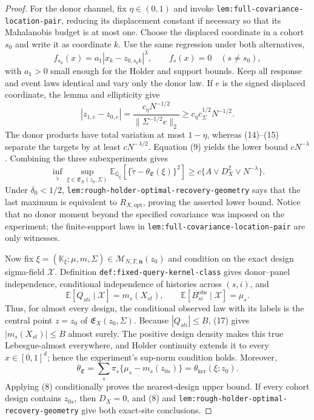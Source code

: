 \documentclass{article}
\begin{document}
\begin{proof}
For the donor channel, fix \(\eta\in(0,1)\) and invoke \texttt{lem:full-covariance-location-pair}, reducing its displacement constant if necessary so that its Mahalanobis budget is at most one.  Choose the displaced coordinate in a cohort \(s_0\) and write it as coordinate \(k\).  Use the same regression under both alternatives,
\[
 f_{s_0}(x)=a_1|x_k-z_{0,s_0k}|^\lambda,
 \qquad f_s(x)=0\quad(s\ne s_0),                            \tag{14}
\]
with \(a_1>0\) small enough for the Holder and support bounds.  Keep all response and event laws identical and vary only the donor law.  If \(e\) is the signed displaced coordinate, the lemma and ellipticity give
\[
 |z_{1,e}-z_{0,e}|=
 \frac{c_\eta N^{-1/2}}{\|\Sigma^{-1/2}e\|_2}
 \ge c_\eta c_\Sigma^{1/2}N^{-1/2}.                       \tag{15}
\]
The donor products have total variation at most \(1-\eta\), whereas (14)--(15) separate the targets by at least \(cN^{-\lambda/2}\).  Equation (9) yields the lower bound \(cN^{-\lambda}\).  Combining the three subexperiments gives
\[
 \inf_{\widetilde\tau}\sup_{\xi\in\mathfrak E_X(z_0,\Sigma)}
 \mathbb E_{\mathbb Q_\xi}
 \left[\{\widetilde\tau-\theta_{\mathfrak E}(\xi)\}^2\right]
 \ge c\{A\vee D_X^2\vee N^{-\lambda}\}.                  \tag{16}
\]
Under \(\delta_0<1/2\), \texttt{lem:rough-holder-optimal-recovery-geometry} says that the last maximum is equivalent to \(R_{X,\mathrm{opt}}\), proving the asserted lower bound.  Notice that no donor moment beyond the specified covariance was imposed on the experiment; the finite-support laws in \texttt{lem:full-covariance-location-pair} are only witnesses.

Now fix \(\xi=(\mathbb K_\xi;\mu,m,\Sigma)\in
\mathcal M_{N,T,\mathbf n}(z_0)\) and condition on the exact design sigma-field \(\mathcal X\).  Definition \texttt{def:fixed-query-kernel-class} gives donor--panel independence, conditional independence of histories across \((s,i)\), and
\[
 \mathbb E[Q_{sti}\mid\mathcal X]=m_s(X_{st}),
 \qquad
 \mathbb E[B_{si}^{\mathrm{obs}}\mid\mathcal X]=\mu_s.     \tag{17}
\]
Thus, for almost every design, the conditional observed law with its labels is the central point \(z=z_0\) of \(\mathfrak E_X(z_0,\Sigma)\).  Because \(|Q_{sti}|\le B\), (17) gives \(|m_s(X_{st})|\le B\) almost surely.  The positive design density makes this true Lebesgue-almost everywhere, and Holder continuity extends it to every \(x\in[0,1]^d\); hence the experiment's sup-norm condition holds.  Moreover,
\[
 \theta_{\mathfrak E}
 =\sum_s\pi_s\{\mu_s-m_s(z_{0s})\}
 =\theta_{\mathrm{ker}}(\xi;z_0).                           \tag{18}
\]
Applying (8) conditionally proves the nearest-design upper bound.  If every cohort design contains \(z_{0s}\), then \(D_X=0\), and (8) and \texttt{lem:rough-holder-optimal-recovery-geometry} give both exact-site conclusions.


\end{proof}
\end{document}
